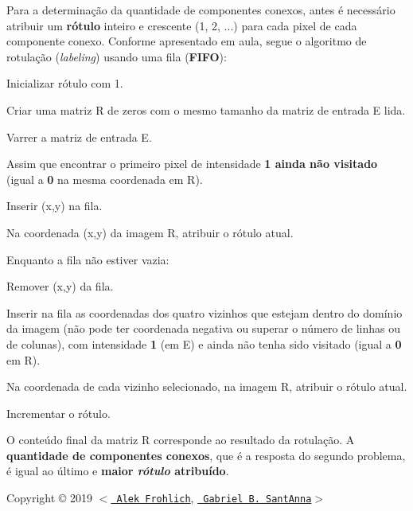 Para a determinação da quantidade de componentes conexos, antes é necessário atribuir um {\bfseries{rótulo}} inteiro e crescente (1, 2, ...) para cada pixel de cada componente conexo. Conforme apresentado em aula, segue o algoritmo de rotulação ({\itshape labeling}) usando uma fila ({\bfseries{F\+I\+FO}})\+:
\begin{DoxyItemize}
\item Inicializar {\ttfamily rótulo} com 1.
\item Criar uma matriz {\ttfamily R} de zeros com o mesmo tamanho da matriz de entrada {\ttfamily E} lida.
\item Varrer a matriz de entrada {\ttfamily E}.
\begin{DoxyItemize}
\item Assim que encontrar o primeiro pixel de intensidade {\bfseries{1 ainda não visitado}} (igual a {\bfseries{0}} na mesma coordenada em {\ttfamily R}).
\begin{DoxyItemize}
\item Inserir {\ttfamily (x,y)} na fila.
\item Na coordenada {\ttfamily (x,y)} da imagem {\ttfamily R}, atribuir o {\ttfamily rótulo} atual.
\end{DoxyItemize}
\item Enquanto a fila não estiver vazia\+:
\begin{DoxyItemize}
\item Remover {\ttfamily (x,y)} da fila.
\item Inserir na fila as coordenadas dos quatro vizinhos que estejam dentro do domínio da imagem (não pode ter coordenada negativa ou superar o número de linhas ou de colunas), com intensidade {\bfseries{1}} (em {\ttfamily E}) e ainda não tenha sido visitado (igual a {\bfseries{0}} em {\ttfamily R}).
\begin{DoxyItemize}
\item Na coordenada de cada vizinho selecionado, na imagem {\ttfamily R}, atribuir o {\ttfamily rótulo} atual.
\end{DoxyItemize}
\end{DoxyItemize}
\item Incrementar o {\ttfamily rótulo}.
\end{DoxyItemize}
\item O conteúdo final da matriz {\ttfamily R} corresponde ao resultado da rotulação. A {\bfseries{quantidade de componentes conexos}}, que é a resposta do segundo problema, é igual ao último e {\bfseries{maior {\itshape rótulo} atribuído}}.
\end{DoxyItemize}

Copyright \copyright{} 2019 $<$\href{https://github.com/alekfrohlich}{\texttt{ Alek Frohlich}}, \href{https://github.com/baioc}{\texttt{ Gabriel B. Sant\textquotesingle{}Anna}}$>$ 